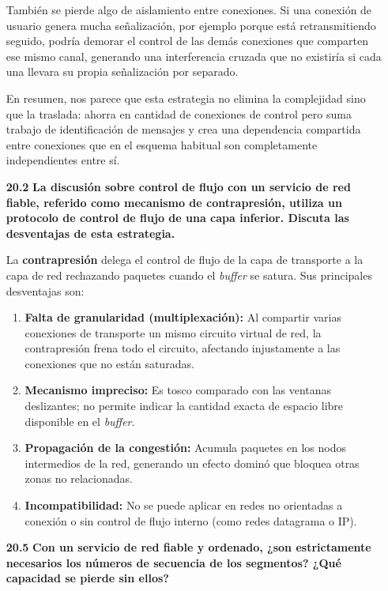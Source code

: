 \documentclass[11pt,a4paper]{article}
\begin{document}
\begin{enumerate}
    También se pierde algo de aislamiento entre conexiones. Si una conexión de usuario genera mucha señalización, por ejemplo porque está retransmitiendo seguido, podría demorar el control de las demás conexiones que comparten ese mismo canal, generando una interferencia cruzada que no existiría si cada una llevara su propia señalización por separado.

    En resumen, nos parece que esta estrategia no elimina la complejidad sino que la traslada: ahorra en cantidad de conexiones de control pero suma trabajo de identificación de mensajes y crea una dependencia compartida entre conexiones que en el esquema habitual son completamente independientes entre sí.

    \item[\textbf{20.2}] \textbf{La discusión sobre control de flujo con un servicio de red fiable, referido como mecanismo de contrapresión, utiliza un protocolo de control de flujo de una capa inferior. Discuta las desventajas de esta estrategia.}

    La \textbf{contrapresión} delega el control de flujo de la capa de transporte a la capa de red rechazando paquetes cuando el \textit{buffer} se satura. Sus principales desventajas son:

\begin{enumerate}
    \item \textbf{Falta de granularidad (multiplexación):} Al compartir varias conexiones de transporte un mismo circuito virtual de red, la contrapresión frena todo el circuito, afectando injustamente a las conexiones que no están saturadas.
    
    \item \textbf{Mecanismo impreciso:} Es tosco comparado con las ventanas deslizantes; no permite indicar la cantidad exacta de espacio libre disponible en el \textit{buffer}.
    
    \item \textbf{Propagación de la congestión:} Acumula paquetes en los nodos intermedios de la red, generando un efecto dominó que bloquea otras zonas no relacionadas.
    
    \item \textbf{Incompatibilidad:} No se puede aplicar en redes no orientadas a conexión o sin control de flujo interno (como redes datagrama o IP).
\end{enumerate}

    \item[\textbf{20.5}] \textbf{Con un servicio de red fiable y ordenado, ¿son estrictamente necesarios los números de secuencia de los segmentos? ¿Qué capacidad se pierde sin ellos?}


\end{enumerate}
\end{document}
